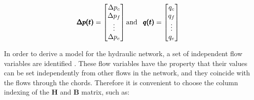 
\begin{equation}
\pmb{\Delta p(t)} =
\begin{bmatrix}
         \Delta p_c \\
	\Delta p_f \\ 
	\vdots \\
	\Delta p_e \\
\end{bmatrix}
\text{and}\hspace{0.3cm}
\pmb{q(t)} =
\begin{bmatrix}
         q_c \\
	q_f \\ 
	\vdots \\
	q_e \\
\end{bmatrix}
\end{equation}


In order to derive a model for the hydraulic network, a set of independent flow variables are identified \cite{TowerModel}. These flow variables have the property that their values can be set independently from other flows in the network, and they coincide with the flows through the chords. 
Therefore it is convenient to choose the column indexing of the 
$\pmb{H}$ and $\pmb{B}$ matrix, such as:



